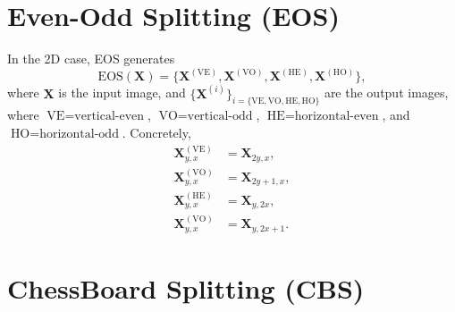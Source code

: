\documentclass{article}
\begin{document}
\section{Even-Odd Splitting (EOS)}
\label{ape:EOS}

In the 2D case, EOS generates
\begin{equation}
  \mathrm{EOS}(\mathbf{X})=\{\mathbf{X}^{(\text{VE})}, \mathbf{X}^{(\text{VO})}, \mathbf{X}^{(\text{HE})}, \mathbf{X}^{(\text{HO})}\},
\end{equation}
where $\mathbf{X}$ is the input image, and $\{\mathbf{X}^{(i)}\}_{i=\{\text{VE}, \text{VO}, \text{HE}, \text{HO}\}}$
  are the output images, where $\text{VE}=\text{vertical-even}$,
  $\text{VO}=\text{vertical-odd}$, $\text{HE}=\text{horizontal-even}$,
  and $\text{HO}=\text{horizontal-odd}$. Concretely,
  \begin{align}
    \mathbf{X}^{(\text{VE})}_{y,x} & = \mathbf{X}_{2y,x}, \\
    \mathbf{X}^{(\text{VO})}_{y,x} & = \mathbf{X}_{2y+1,x}, \\
    \mathbf{X}^{(\text{HE})}_{y,x} & = \mathbf{X}_{y,2x},\\
    \mathbf{X}^{(\text{VO})}_{y,x} & = \mathbf{X}_{y,2x+1}.
  \end{align}
  

\section{ChessBoard Splitting (CBS)}
\label{ape:CBS}
\end{document}
